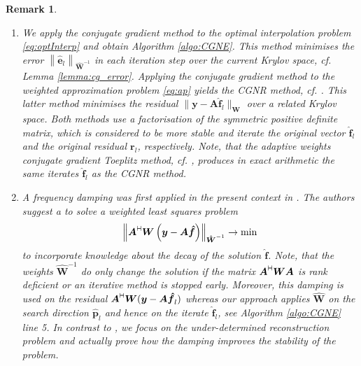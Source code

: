 \documentclass[11pt,a4paper,bibtotoc]{scrartcl}
\newcommand{\zb}[1]{\ensuremath{\boldsymbol{#1}}}
\newcommand{\adj}{{\vdash \hspace*{-1.72mm} \dashv}}
\newtheorem{remark}[theorem]{Remark}
\newenvironment{Remark}{\goodbreak \begin{remark}\rm}{\end{remark}}
\numberwithin{equation}{section}
\numberwithin{table}{section}
\numberwithin{figure}{section}
\begin{document}
\begin{Remark}
\begin{enumerate}
  Estimates for the extremal eigenvalues $\lambda,\,\Lambda$ in case of the
  interpolation by radial and zonal functions are obtained in
  \cite{NaSiWa98,Wen05}, these estimates depend on the separation distance $q$
  of the sampling set, too.
\item We apply the conjugate gradient method to the optimal interpolation
  problem \eqref{eq:optInterp} and obtain Algorithm \ref{algo:CGNE}.
  This method minimises the error $\left\|\zb {\hat e}_l\right\|_{\zb {\hat
  W}^{-1}}$ in each iteration step over the current Krylov space, cf. Lemma
  \ref{lemma:cg_error}.
  Applying the conjugate gradient method to the weighted approximation problem
  \eqref{eq:ap} yields the CGNR method, cf. \cite[pp. 288]{Bj96}.
  This latter method minimises the residual $\|\zb y - \zb A \zb {\hat
  f}_l\|_{\zb W}$ over a related Krylov space.
  Both methods use a factorisation of the symmetric positive definite matrix,
  which is considered to be more stable and iterate the original vector $\zb
  {\hat f}_l$ and the original residual $\zb r_l$, respectively.
  Note, that the adaptive weights conjugate gradient Toeplitz method,
  cf. \cite{FeGrSt95}, produces in exact arithmetic the same iterates $\zb
  {\hat f}_l$ as the CGNR method.
\item A frequency damping was first applied in the present context in
  \cite{RaSt98}. 
  The authors suggest a to solve a weighted least squares problem
  \begin{equation*}
    \left\|\zb A^{\adj} \zb W \left(\zb y - \zb A \zb {\hat
      f}\right)\right\|_{\zb {\hat W}^{-1}} \rightarrow \min
  \end{equation*}
  to incorporate knowledge about the decay of the solution $\zb {\hat f}$.
  Note, that the weights $\zb {\hat W}^{-1}$ do only change the solution if
  the matrix $\zb A^{\adj} \zb W \zb A$ is rank deficient or an iterative
  method is stopped early.
  Moreover, this damping is used on the residual $\zb A^{\adj} \zb W (\zb y -
  \zb A\zb {\hat f}_l)$ whereas our approach applies $\zb {\hat W}$ on the
  search direction $\zb {\hat p}_l$ and hence on the iterate $\zb {\hat f}_l$,
  see Algorithm \ref{algo:CGNE} line 5.
  In contrast to \cite{RaSt98}, we focus on the under-determined
  reconstruction problem and actually prove how the damping improves the
  stability of the problem.
\end{enumerate}
\end{Remark}

\end{document}
